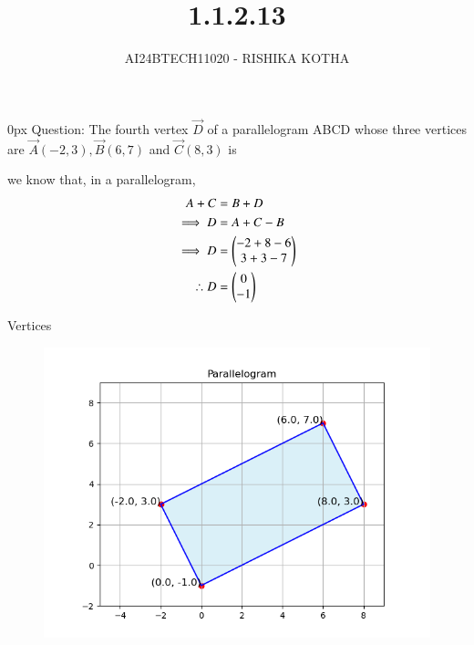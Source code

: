 \documentclass[journal]{IEEEtran}
\begin{document}

\vspace{3cm}

\title{1.1.2.13}
\author{AI24BTECH11020 - RISHIKA KOTHA}
{\let\newpage\relax\maketitle}

\renewcommand{\thefigure}{\theenumi}
\renewcommand{\thetable}{\theenumi}
\setlength{\intextsep}{10pt} %


\renewcommand{\thetable}{\theenumi}
\parindent 0px
Question:
The fourth vertex $\vec{D}$ of a parallelogram ABCD whose three vertices are $\vec{A}(-2, 3),\vec{B}(6, 7)$ and $\vec{C}(8, 3)$ is
\\
\solution

we know that, in a parallelogram,
\begin{align}
	                A+C&=B+D\\
	\implies	D&=A+C-B\\
	\implies        D&=\begin{pmatrix}-2+8-6\\3+3-7\end{pmatrix}\\
	\therefore	D&=\begin{pmatrix}0\\-1\end{pmatrix}
\end{align}
\begin{table}[h!]    
  \centering
  
  \caption{Vertices}
  \label{tab1.2.13.1}
\end{table}

\begin{figure}[h!]
   \centering
   \includegraphics[width=0.7\columnwidth]{fig/fig1.png}
   \label{parallelogram graph}
\end{figure}

 
\end{document}
